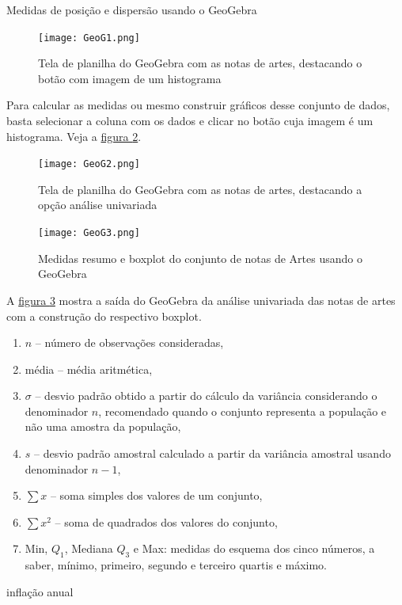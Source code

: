 {{\begin{example}{Medidas de posição e dispersão usando o GeoGebra}
\begin{figure}[H]
\centering

\texttt{[image: GeoG1.png]}
\caption{Tela de planilha do GeoGebra com as notas de artes, destacando o botão com imagem de um histograma}
\label{GeoG1}
\end{figure}

Para calcular as medidas ou mesmo construir gráficos desse conjunto de dados, basta selecionar a coluna com os dados e clicar no botão cuja imagem é um histograma. Veja a \hyperref[GeoG2]{figura \ref{GeoG2}}.

\begin{figure}[H]
\centering

\texttt{[image: GeoG2.png]}
\caption{Tela de planilha do GeoGebra com as notas de artes, destacando a opção análise univariada}
\label{GeoG2}
\end{figure}

\begin{figure}[H]
\centering

\texttt{[image: GeoG3.png]}
\caption{Medidas resumo e boxplot do conjunto de notas de Artes usando o GeoGebra}
\label{GeoG3}
\end{figure}

A \hyperref[GeoG3]{figura \ref{GeoG3}} mostra a saída do GeoGebra da análise univariada das notas de artes com a construção do respectivo boxplot.

\begin{enumerate}
\item $n$ -- número de observações consideradas,
\item média -- média aritmética,
\item $\sigma$ -- desvio padrão obtido a partir do cálculo da variância considerando o denominador $n$, recomendado quando o conjunto representa a população e não uma amostra da população,
\item $s$ -- desvio padrão amostral calculado a partir da variância amostral usando denominador $n-1$,
\item $\sum x$ -- soma simples dos valores de um conjunto,
\item $\sum x^2$ -- soma de quadrados dos valores do conjunto,
\item Min, $Q_1$, Mediana $Q_3$ e Max: medidas do esquema dos cinco números, a saber, mínimo, primeiro, segundo e terceiro quartis e máximo.
\end{enumerate}
\end{example}


\begin{task}{inflação anual}
\label{inflacao-dois-paises}


\end{task}}}
